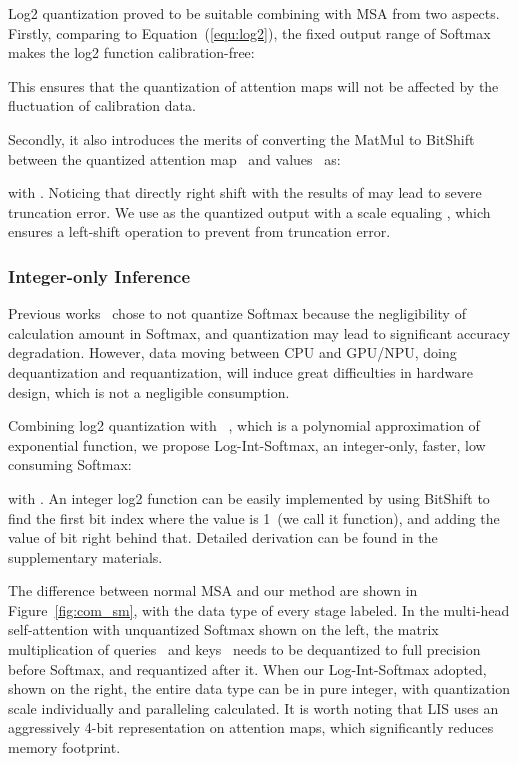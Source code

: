 \documentclass{article}
\begin{document}
Log2 quantization proved to be suitable combining with MSA from two aspects. Firstly, comparing to Equation~(\ref{equ:log2}), the fixed output range  of Softmax makes the log2 function calibration-free:

This ensures that the quantization of attention maps will not be affected by the fluctuation of calibration data.

Secondly, it also introduces the merits of converting the MatMul to BitShift between the quantized attention map~ and values~ as:

with .
Noticing that directly right shift  with the results of  may lead to severe truncation error. We use  as the quantized output with a scale equaling , which ensures a left-shift operation to prevent from truncation error.



\subsubsection{Integer-only Inference}


Previous works~\cite{liu2021post} chose to not quantize Softmax because the negligibility of calculation amount in Softmax, and quantization may lead to significant accuracy degradation. However, data moving between CPU and GPU/NPU, doing dequantization and requantization, will induce great difficulties in hardware design, which is not a negligible consumption.

Combining log2 quantization with ~\cite{kim2021bert}, which is a polynomial approximation of exponential function, we propose Log-Int-Softmax, an integer-only, faster, low consuming Softmax:


with . An integer log2 function can be easily implemented by using BitShift to find the first bit index where the value is 1~(we call it  function), and adding the value of bit right behind that. Detailed derivation can be found in the supplementary materials.


The difference between normal MSA and our method are shown in Figure~\ref{fig:com_sm}, with the data type of every stage labeled. In the multi-head self-attention with unquantized Softmax shown on the left, the matrix multiplication of queries~ and keys~ needs to be dequantized to full precision before Softmax, and requantized after it. When our Log-Int-Softmax adopted, shown on the right, the entire data type can be in pure integer, with quantization scale individually and paralleling calculated. 
It is worth noting that LIS uses an aggressively 4-bit representation on attention maps, which significantly reduces memory footprint.
\end{document}
